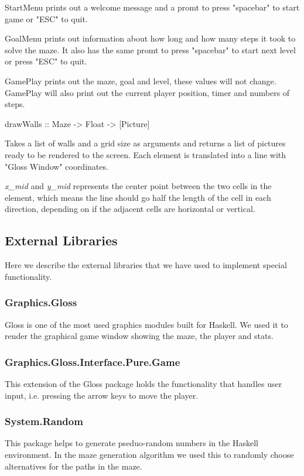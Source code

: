\documentclass[12pt, a4paper]{article}
\begin{document}
StartMenu prints out a welcome message and a promt to press "spacebar" to start game or "ESC" to quit.

GoalMenu prints out information about how long and how many steps it took to solve the maze. It also has the same promt to press "spacebar" to start next level or press "ESC" to quit.

GamePlay prints out the maze, goal and level, these values will not change. GamePlay will also print out the current player position, timer and numbers of steps. 

\begin{code}
drawWalls :: Maze -> Float -> [Picture]
\end{code}
Takes a list of walls and a grid size as arguments and returns a list of pictures ready to be rendered to the screen. Each element is translated into a line with "Gloss Window" coordinates. 

\textit{x\_mid} and \textit{y\_mid} represents the center point between the two cells in the element, which means the line should go half the length of the cell in each direction, depending on if the adjacent cells are horizontal or vertical.





\subsection{External Libraries}
Here we describe the external libraries that we have used to implement special functionality.


\subsubsection*{Graphics.Gloss}
Gloss is one of the most used graphics modules built for Haskell. We used it to render the graphical game window showing the maze, the player and stats.


\subsubsection*{Graphics.Gloss.Interface.Pure.Game}
This extension of the Gloss package holds the functionality that handles user input, i.e. pressing the arrow keys to move the player.


\subsubsection*{System.Random}
This package helps to generate pseduo-random numbers in the Haskell environment. In the maze generation algorithm we used this to randomly choose alternatives for the paths in the maze.\cite{System.Random}
\end{document}
